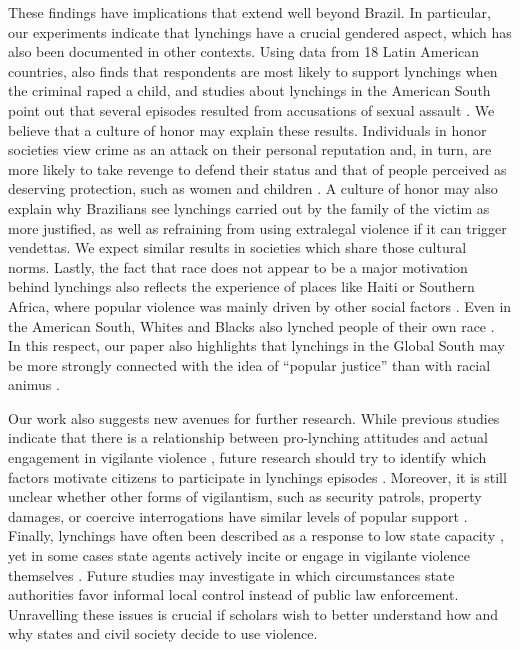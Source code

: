 \documentclass[12pt,a4paper]{article}
\begin{document}
These findings have implications that extend well beyond Brazil. In particular,
our experiments indicate that lynchings have a crucial gendered aspect, which
has also been documented in other contexts. Using data from 18 Latin American
countries, \citet{nivette2016institutional} also finds that respondents are
most likely to support lynchings when the criminal raped a child, and studies
about lynchings in the American South point out that several episodes resulted
from accusations of sexual assault \citep{jacquet2013giles, smaangs2020race}.
We believe that a culture of honor may explain these results. Individuals in
honor societies view crime as an attack on their personal reputation and, in
turn, are more likely to take revenge to defend their status and that of people
perceived as deserving protection, such as women and children
\citep{nisbett2018culture}. A culture of honor may also explain why Brazilians
see lynchings carried out by the family of the victim as more justified, as
well as refraining from using extralegal violence if it can trigger vendettas.
We expect similar results in societies which share those cultural norms.
Lastly, the fact that race does not appear to be a major motivation behind
lynchings also reflects the experience of places like Haiti or Southern Africa,
where popular violence was mainly driven by other social factors
\citep{berg2011globalizing, jung2020lynching}. Even in the American South,
Whites and Blacks also lynched people of their own race \citep{beck1997race}.
In this respect, our paper also highlights that lynchings in the Global South
may be more strongly connected with the idea of ``popular justice'' than with
racial animus \citep{kloppe2019lynching, martins2015linchamentos}.

Our work also suggests new avenues for further research. While previous studies
indicate that there is a relationship between pro-lynching attitudes and actual
engagement in vigilante violence \citep{weisburd1988vigilantism}, future
research should try to identify which factors motivate citizens to participate
in lynchings episodes \citep{nivette2016institutional}. Moreover, it is still
unclear whether other forms of vigilantism, such as security patrols, property
damages, or coercive interrogations have similar levels of popular support
\citep{bateson2020politics}. Finally, lynchings have often been described as a
response to low state capacity \citep{trevizo2022mexico}, yet in some cases
state agents actively incite or engage in vigilante violence themselves
\citep{arias2010violent}. Future studies may investigate in which circumstances
state authorities favor informal local control instead of public law
enforcement. Unravelling these issues is crucial if scholars wish to better
understand how and why states and civil society decide to use violence.

\setlength{\parindent}{0cm}
\setlength{\parskip}{5pt}


\end{document}
